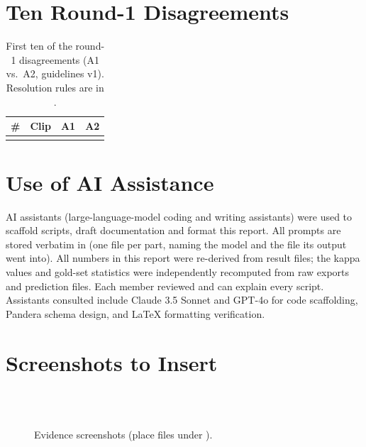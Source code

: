 \documentclass[sigconf,authordraft]{acmart}
\begin{document}
\section{Ten Round-1 Disagreements}\label{app:dis}
\begin{table}[htbp]
\caption{First ten of the \DisOne{} round-1 disagreements (A1 vs.\ A2, guidelines v1). Resolution rules are in .}\label{tab:dis}
\begin{tabular}{rp{3.6cm}ll}
\toprule \# & Clip & A1 & A2 \\ \midrule

\\ \bottomrule
\end{tabular}
\end{table}

\section{Use of AI Assistance}
AI assistants (large-language-model coding and writing assistants) were used to scaffold scripts, draft documentation and format this report. All prompts are stored verbatim in  (one file per part, naming the model and the file its output went into). All numbers in this report were re-derived from result files; the kappa values and gold-set statistics were independently recomputed from raw exports and prediction files. Each member reviewed and can explain every script. Assistants consulted include Claude 3.5 Sonnet and GPT-4o for code scaffolding, Pandera schema design, and LaTeX formatting verification.

\section{Screenshots to Insert}
\begin{figure}[htbp]\centering
{}\\[3pt]
\\[3pt]
\caption{Evidence screenshots (place files under ).}
\end{figure}
\end{document}
